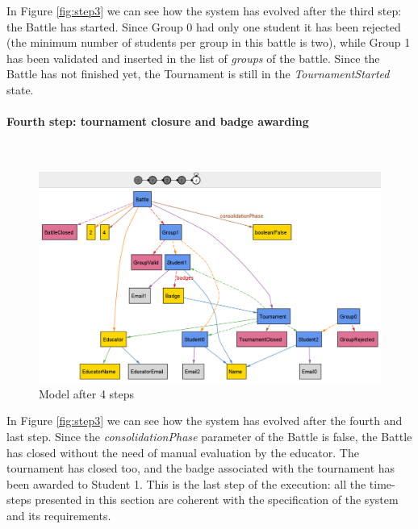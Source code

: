 In Figure \ref{fig:step3} we can see how the system has evolved after the third step: the Battle has started. Since Group 0 had only one student it has been rejected (the minimum number of students per group in this battle is two), while Group 1 has been validated and inserted in the list of \textit{groups} of the battle. Since the Battle has not finished yet, the Tournament is still in the \textit{TournamentStarted} state.

\newpage

\paragraph{Fourth step: tournament closure and badge awarding}
\textbf{ }\\

\begin{figure}[h]
    \centering
    \includegraphics[scale=0.53]{Images/AlloyStep4.png}
    \caption{Model after 4 steps}
    \label{fig:step4}
\end{figure}

In Figure \ref{fig:step3} we can see how the system has evolved after the fourth and last step. Since the \textit{consolidationPhase} parameter of the Battle is false, the Battle has closed without the need of manual evaluation by the educator. The tournament has closed too, and the badge associated with the tournament has been awarded to Student 1. This is the last step of the execution: all the time-steps presented in this section are coherent with the specification of the system and its requirements.